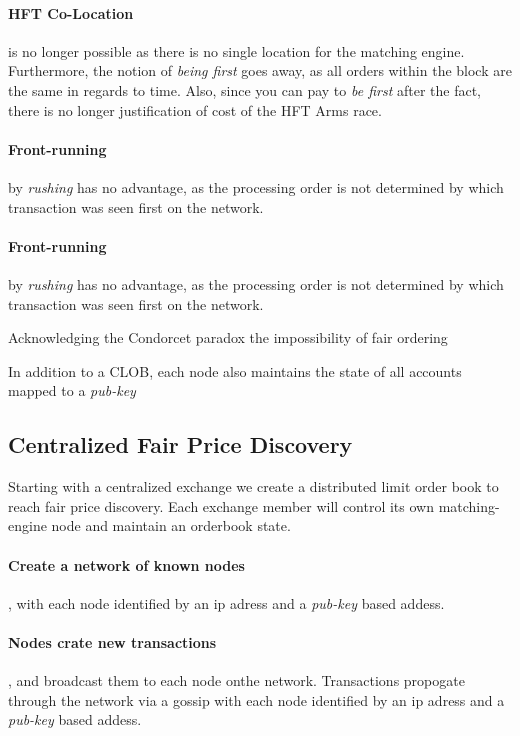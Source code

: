 \documentclass[12pt]{article}
\begin{document}
\paragraph*{HFT Co-Location} is no longer possible as there is no single location for the matching engine. Furthermore, the notion of \emph{being first} goes away, as all orders within the block are the same in regards to time. Also, since you can pay to \emph{be first} after the fact, there is no longer justification of cost of the HFT Arms race. 

\paragraph*{Front-running} by \emph{rushing} has no advantage, as the processing order is not determined by which transaction was seen first on the network. 

\paragraph*{Front-running} by \emph{rushing} has no advantage, as the processing order is not determined by which transaction was seen first on the network. 

Acknowledging the Condorcet paradox the impossibility of fair ordering \cite{Kelkar_2020} 



In addition to a CLOB, each node also maintains the state of all accounts mapped to a \emph{pub-key} 

\subsection{Centralized Fair Price Discovery}
Starting with a centralized exchange we create a distributed limit order book to reach fair price discovery. Each exchange member will control its own matching-engine node and maintain an orderbook state.       

\paragraph*{Create a network of known nodes}, with each node identified by an ip adress and a \emph{pub-key} based addess.     

\paragraph*{Nodes crate new transactions}, and broadcast them to each node onthe network. Transactions propogate through the network via a gossip   with each node identified by an ip adress and a \emph{pub-key} based addess.     
\end{document}
